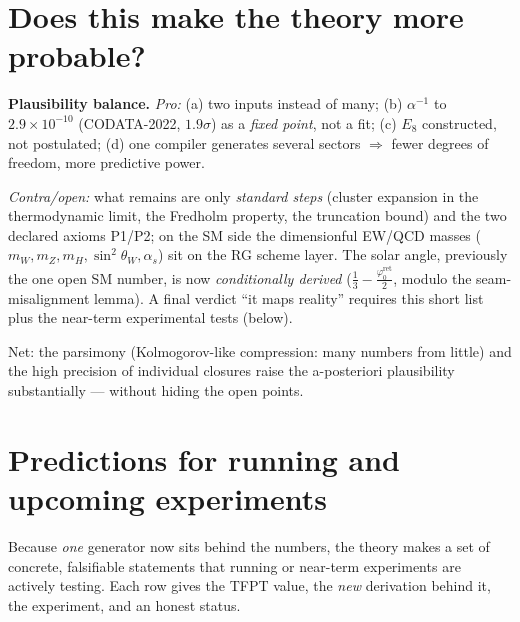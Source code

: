 \documentclass[11pt,a4paper]{article}
\newcommand{\phiz}{\varphi_0^{\mathrm{ret}}}
\newcommand{\ainv}{\alpha^{-1}}
\begin{document}
\section{Does this make the theory more probable?}
\noindent\textbf{Plausibility balance.}
\emph{Pro:} (a) two inputs instead of many; (b) $\ainv$ to $2.9\times10^{-10}$ (CODATA-2022, $1.9\sigma$) as a \emph{fixed point},
not a fit; (c) $E_8$ constructed, not postulated; (d) one compiler generates several sectors $\Rightarrow$
fewer degrees of freedom, more predictive power.
\par\smallskip
\noindent\emph{Contra/open:} what remains are only \emph{standard steps} (cluster expansion in the thermodynamic
limit, the Fredholm property, the truncation bound) and the two declared axioms P1/P2; on the SM side the
dimensionful EW/QCD masses ($m_W,m_Z,m_H,\sin^2\theta_W,\alpha_s$) sit on the RG scheme layer. The solar
angle, previously the one open SM number, is now \emph{conditionally derived} ($\tfrac13-\tfrac{\phiz}{2}$,
modulo the seam-misalignment lemma). A final
verdict ``it maps reality'' requires this short list plus the near-term experimental tests (below).

Net: the parsimony (Kolmogorov-like compression: many numbers from little) and the high precision of
individual closures raise the a-posteriori plausibility substantially --- without hiding the open points.

\section{Predictions for running and upcoming experiments}
Because \emph{one} generator now sits behind the numbers, the theory makes a set of concrete, falsifiable
statements that running or near-term experiments are actively testing. Each row gives the TFPT value,
the \emph{new} derivation behind it, the experiment, and an honest status.


\end{document}

